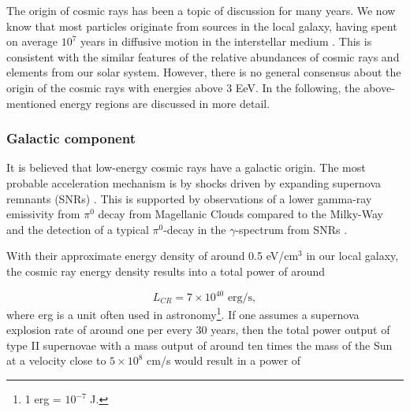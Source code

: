 The origin of cosmic rays has been a topic of discussion for many years. We now know that most particles originate from sources in the local galaxy, having spent on average $10^7$ years in diffusive motion in the interstellar medium \cite{Gaisser:2013bla}. This is consistent with the similar features of the relative abundances of cosmic rays and elements from our solar system. However, there is no general consensus about the origin of the cosmic rays with energies above 3 EeV. In the following, the above-mentioned energy regions are discussed in more detail.




\subsubsection{Galactic component}
\label{subsubsec:galactic}
It is believed that low-energy cosmic rays have a galactic origin. The most probable acceleration mechanism is by shocks driven by expanding supernova remnants (SNRs) \cite{0034-4885-64-4-201}. This is supported by observations of a lower gamma-ray emissivity from $\pi^0$ decay from Magellanic Clouds compared to the Milky-Way \cite{Fermi-LAT:2010fcp} and the detection of a typical $\pi^0$-decay in the $\gamma$-spectrum from SNRs \cite{Ackermann:2013wqa}. 

With their approximate energy density of around 0.5 eV/cm$^3$ in our local galaxy, the cosmic ray energy density results into a total power of around

\begin{equation}
L_{CR} = 7 \times 10^{40} \textrm{ erg/s},
\end{equation}
where erg is a unit often used in astronomy\footnote{1 erg = $10^{-7}$ J.}. If one assumes a supernova explosion rate of around one per every 30 years, then the total power output of type II supernovae with a mass output of around ten times the mass of the Sun at a velocity close to $5 \times 10^{8}$ cm/s would result in a power of

